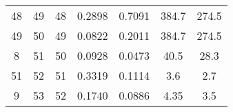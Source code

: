 \begin{table}
\begin{adjustbox}{width=0.95\textwidth,center=\textwidth}
\begin{tabular}{ccccccc}
48                                                        & 49                                                          & 48                                                  & 0.2898                                                                    & 0.7091                                                                    & 384.7                                                                       & 274.5                                                                            \\
49                                                        & 50                                                          & 49                                                  & 0.0822                                                                    & 0.2011                                                                    & 384.7                                                                       & 274.5                                                                            \\
8                                                         & 51                                                          & 50                                                  & 0.0928                                                                    & 0.0473                                                                    & 40.5                                                                        & 28.3                                                                             \\
51                                                        & 52                                                          & 51                                                  & 0.3319                                                                    & 0.1114                                                                    & 3.6                                                                         & 2.7                                                                              \\
9                                                         & 53                                                          & 52                                                  & 0.1740                                                                    & 0.0886                                                                    & 4.35                                                                        & 3.5                                                                              \\

\end{tabular}
\end{adjustbox}
\end{table}
